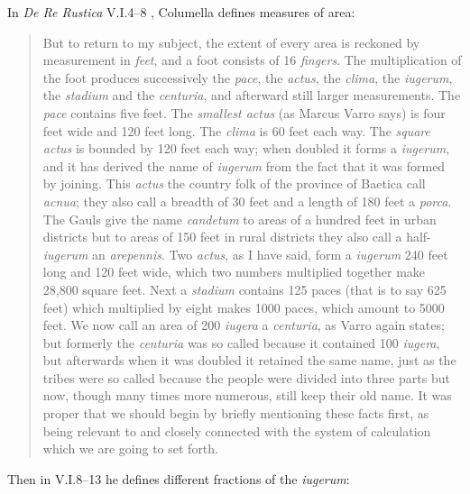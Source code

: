 \documentclass{article}
\theoremstyle{definition}
\begin{document}
In {\em De Re Rustica} V.I.4--8 \cite[pp.~5--7]{columellaII}, Columella defines  measures of area:

\begin{quote}
But to return to my subject, the extent of every area is reckoned by measurement in {\em feet}, and a foot consists of 16 {\em fingers}. The multiplication of the foot produces 
successively the {\em pace}, the {\em actus}, the {\em clima}, the {\em iugerum}, the {\em stadium} and the {\em centuria}, and afterward still larger measurements. The {\em pace} 
contains five feet. The {\em smallest actus} (as Marcus Varro says) is four feet wide and 120 feet long. The {\em clima} is 60 feet each way. The {\em square actus} is bounded by
120 feet each way; when doubled it forms a {\em iugerum}, and it has derived the name of {\em iugerum} from the fact that it was formed by joining. This {\em actus} the country folk
of the province of Baetica call {\em acnua}; they also call a breadth of 30 feet and a length of 180 feet a {\em porca}. The Gauls give the name  {\em candetum} to areas of a
hundred feet in urban districts but to areas of 150 feet in rural districts they also call a half-{\em iugerum} an {\em arepennis}. Two {\em actus}, as I have said, form a {\em iugerum} 
240 feet long and 120 feet wide, which two numbers multiplied together make 28,800 square feet. Next a {\em stadium} contains 125 paces (that is to say 625 feet) which
multiplied by eight makes 1000 paces, which amount to 5000 feet. We now call an area of 200 {\em iugera} a {\em centuria}, as Varro again states; but formerly the {\em centuria}
was so called because it contained 100 {\em iugera}, but afterwards when it was doubled it retained the same name, just as the tribes were so called because the people were 
divided into three parts but now, though many times more numerous, still keep their old name. It was proper that we should begin by briefly mentioning these facts first, as being 
relevant to and closely connected with the system of calculation which we are going to set forth.
\end{quote}

Then in V.I.8--13 \cite[pp.~9--13]{columellaII} he defines different fractions of the {\em iugerum}:
\end{document}
